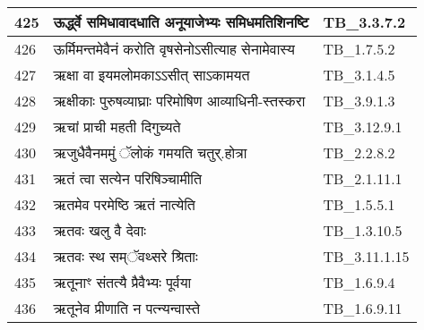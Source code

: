 \documentclass[17pt]{extarticle}
\begin{document}
\begin{longtable}{||p{0.4in}||p{4.9in}||p{0.9in}||}
    \hline
        
    425 & ऊर्द्ध्वे समिधावादधाति अनूयाजेभ्यः समिधमतिशिनष्टि & TB\_3.3.7.2       \\
    
    \hline
        
    426 & ऊर्मिमन्तमेवैनं करोति वृषसेनोऽसीत्याह सेनामेवास्य & TB\_1.7.5.2       \\
    
    \hline
        
    427 & ऋक्षा वा इयमलोमकाऽऽसीत् साऽकामयत & TB\_3.1.4.5       \\
    
    \hline
        
    428 & ऋक्षीकाः पुरुषव्याघ्राः परिमोषिण आव्याधिनी{-}स्तस्करा & TB\_3.9.1.3       \\
    
    \hline
        
    429 & ऋचां प्राची महती दिगुच्यते & TB\_3.12.9.1       \\
    
    \hline
        
    430 & ऋजुधैवैनममुं ॅलोकं गमयति चतुर्.होत्रा & TB\_2.2.8.2       \\
    
    \hline
        
    431 & ऋतं त्वा सत्येन परिषिञ्चामीति & TB\_2.1.11.1       \\
    
    \hline
        
    432 & ऋतमेव परमेष्ठि ऋतं नात्येति & TB\_1.5.5.1       \\
    
    \hline
        
    433 & ऋतवः खलु वै देवाः & TB\_1.3.10.5       \\
    
    \hline
        
    434 & ऋतवः स्थ सम्ॅवथ्सरे श्रिताः & TB\_3.11.1.15       \\
    
    \hline
        
    435 & ऋतूनाꣳ संतत्यै प्रैवैभ्यः पूर्वया & TB\_1.6.9.4       \\
    
    \hline
        
    436 & ऋतूनेव प्रीणाति न पत्न्यन्वास्ते & TB\_1.6.9.11       \\
    
    \hline
        

\end{longtable}
\end{document}
